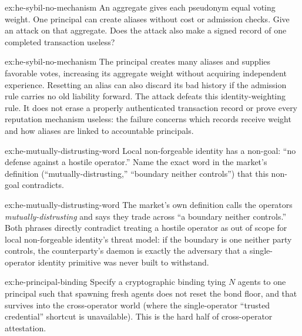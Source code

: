 \documentclass[11pt,a4paper]{article}
\theoremstyle{definition}
\theoremstyle{definition}
\theoremstyle{remark}
\begin{document}
\begin{pdexercise}[kind=Check,rating=1]{ex:he-sybil-no-mechanism}
An aggregate gives each pseudonym equal voting weight. One principal can
create aliases without cost or admission checks. Give an attack on that aggregate.
Does the attack also make a signed record of one completed transaction useless?
\end{pdexercise}
\begin{pdsolution}{ex:he-sybil-no-mechanism}
The principal creates many aliases and supplies favorable votes, increasing
its aggregate weight without acquiring independent experience. Resetting an alias
can also discard its bad history if the admission rule carries no old liability
forward. The attack defeats this identity-weighting rule. It does not erase a
properly authenticated transaction record or prove every reputation mechanism
useless: the failure concerns which records receive weight and how aliases are
linked to accountable principals.
\end{pdsolution}
\begin{pdexercise}[kind=Check,rating=1]{ex:he-mutually-distrusting-word}
Local non-forgeable identity has a non-goal: ``no defense against a hostile
  operator.'' Name the exact word in the market's definition
  (``mutually-distrusting,'' ``boundary neither controls'') that this non-goal
  contradicts.
\end{pdexercise}
\begin{pdsolution}{ex:he-mutually-distrusting-word}
The market's own definition calls the operators \emph{mutually-distrusting}
and says they trade across ``a boundary neither controls.'' Both phrases
directly contradict treating a hostile operator as out of scope for local
non-forgeable identity's threat model: if the boundary is one neither party
controls, the counterparty's daemon is exactly the adversary that a
single-operator identity primitive was never built to withstand.
\end{pdsolution}
\begin{pdexercise}[kind=Open,rating=3]{ex:he-principal-binding}
Specify a cryptographic binding tying $N$ agents to one principal
  such that spawning fresh agents does not reset the bond floor, and that survives
  into the cross-operator world (where the single-operator ``trusted credential''
  shortcut is unavailable). This is the hard half of cross-operator attestation.
\end{pdexercise}
\end{document}
